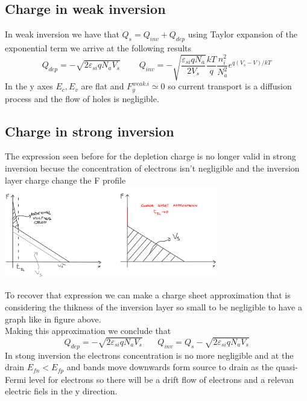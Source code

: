 \subsection{Charge in weak inversion}
In weak inversion we have that $Q_s=Q_{inv}+Q_{dep}$  using Taylor expansion of the exponential term we arrive at the following results
\begin{equation}
Q_{dep}=-\sqrt{2\varepsilon_{si}qN_aV_s}\ \ \ \ \ \ \ \ \ \   Q_{inv}=-\sqrt{\frac{\varepsilon_{si}qN_a}{2V_s}}\frac{kT}{q}\frac{n_i^2}{N_a^2}e^{q(V_s-V)/kT}
\end{equation}
In the y axes $E_c, E_v$ are flat and $F_y^{weak.i}\simeq0$ so current transport is a diffusion process and the flow of holes is negligible.\\

\vspace{3mm}
\centering
{}
\raggedright

\subsection{Charge in strong inversion}
The expression seen before for the depletion charge is no longer valid in strong inversion becuse the concentration of electrons isn't negligible and the inversion layer charge change the F profile \\


\centering
\includegraphics[width=0.7\textwidth]{csa.png}\\
\raggedright

To recover that expression we can make a charge sheet approximation that is considering the thikness of the inversion layer so small to be negligible to have a graph like in figure above.\\
Making this approximation we conclude that
\begin{equation}
Q_{dep}=-\sqrt{2\varepsilon_{si}qN_aV_s} \ \ \ \ \ \ \ \ Q_{inv}=Q_s-\sqrt{2\varepsilon_{si}qN_aV_s}
\end{equation}
In stong inversion the electrons concentration is no more negligible and at the drain $E_{fn}<E_{fp}$ and bands move downwards form source to drain as the quasi-Fermi level for electrons so there will be a drift flow of electrons and a relevan electric fiels in the y direction.\\


